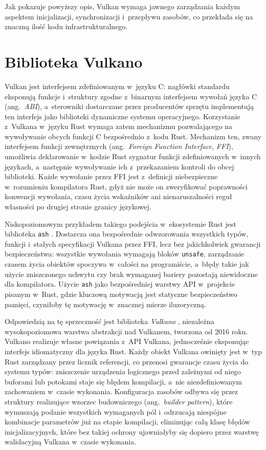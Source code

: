 Jak pokazuje powyższy opis, Vulkan wymaga jawnego zarządzania każdym aspektem
inicjalizacji, synchronizacji i~przepływu zasobów, co przekłada się na znaczną ilość
kodu infrastrukturalnego. 


\section{Biblioteka Vulkano}

Vulkan jest interfejsem zdefiniowanym w~języku C: nagłówki standardu eksponują funkcje
i~struktury zgodne z~binarnym interfejsem wywołań języka C (ang.~\textit{ABI}), a~sterowniki
dostarczane przez producentów sprzętu implementują ten interfejs jako biblioteki dynamiczne
systemu operacyjnego. Korzystanie z~Vulkana w~języku Rust wymaga zatem mechanizmu
pozwalającego na wywoływanie obcych funkcji C bezpośrednio z~kodu Rust.
Mechanizm ten, zwany interfejsem funkcji zewnętrznych (ang.~\textit{Foreign Function Interface},
\textit{FFI}), umożliwia deklarowanie w~kodzie Rust sygnatur funkcji zdefiniowanych w~innych
językach, a~następnie wywoływanie ich z~przekazaniem kontroli do obcej biblioteki.
Każde wywołanie przez FFI jest z~definicji niebezpieczne w~rozumieniu kompilatora Rust,
gdyż nie może on zweryfikować poprawności konwencji wywołania, czasu życia wskaźników
ani nienaruszalności reguł własności po drugiej stronie granicy językowej.

Niskopoziomowym przykładem takiego podejścia w~ekosystemie Rust jest biblioteka
\texttt{ash} \cite{ash-rs}. Dostarcza ona bezpośrednie odwzorowania wszystkich typów,
funkcji i~stałych specyfikacji Vulkana przez FFI, lecz bez jakichkolwiek gwarancji
bezpieczeństwa: wszystkie wywołania wymagają bloków \texttt{unsafe}, zarządzanie
czasem życia obiektów spoczywa w~całości na programiście, a~błędy takie jak użycie
zniszczonego uchwytu czy brak wymaganej bariery pozostają niewidoczne dla kompilatora.
Użycie \texttt{ash} jako bezpośredniej warstwy API w~projekcie pisanym w~Rust,
gdzie kluczową motywacją jest statyczne bezpieczeństwo pamięci, czyniłoby tę motywację
w~znacznej mierze iluzoryczną.

Odpowiedzią na tę sprzeczność jest biblioteka \textit{Vulkano} \cite{vulkano-rs},
niezależna wysokopoziomowa warstwa abstrakcji nad Vulkanem, tworzona od 2016 roku.
Vulkano realizuje własne powiązania z~API Vulkana,
jednocześnie eksponując interfejs idiomatyczny dla języka Rust.
Każdy obiekt Vulkana owinięty jest w~typ Rust zarządzany przez licznik referencji,
co przenosi gwarancje czasu życia do systemu typów: zniszczenie urządzenia logicznego
przed zależnymi od niego buforami lub potokami staje się błędem kompilacji, a~nie
niezdefiniowanym zachowaniem w~czasie wykonania. Konfiguracja zasobów odbywa się przez
struktury realizujące wzorzec budowniczego (ang.~\textit{builder pattern}), 
które wymuszają podanie wszystkich wymaganych pól
i~odrzucają niespójne kombinacje parametrów już na etapie kompilacji, eliminując
całą klasę błędów inicjalizacyjnych, które bez takiej ochrony ujawniałyby się dopiero
przez warstwę walidacyjną Vulkana w~czasie wykonania.


